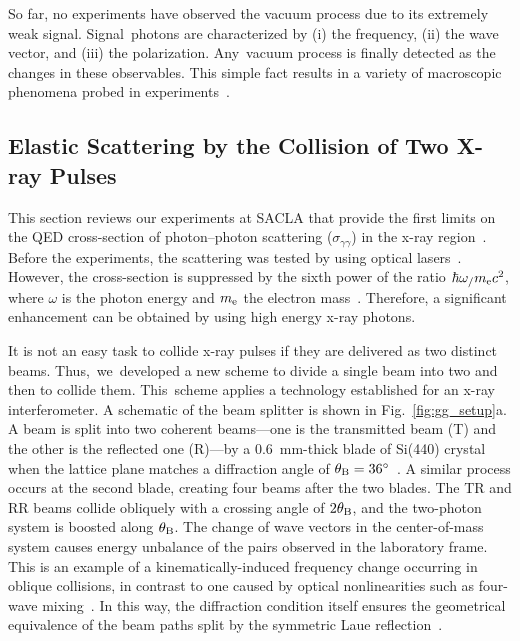\documentclass[10pt,a4paper]{article}%
\begin{document}
So far, no experiments have observed the vacuum process due to its extremely weak signal.
Signal~photons are characterized by (i) the frequency, (ii) the wave vector, and (iii) the polarization.
Any~vacuum process is finally detected as the changes in these observables.
This simple fact results in a variety of macroscopic phenomena probed in experiments~\cite{review1, review2}.

\subsection{Elastic Scattering by the Collision of Two X-ray Pulses}\label{subsec:gg}

This section reviews our experiments at SACLA that provide the first limits on the QED cross-section of photon--photon scattering ($\sigma_{\gamma\gamma}$) in the x-ray region~\cite{gg1,gg2}.
Before the experiments, the scattering was tested by using optical lasers~\cite{moulin}.
However, the cross-section is suppressed by the sixth power of the ratio $\hbar \omega_/m_{{\rm e}}c^{2}$,
where $\omega$ is the photon energy and $m_{{\rm e}}$ the electron mass~\cite{gg_xsec1, gg_xsec2}.
Therefore, a significant enhancement can be obtained by using high energy x-ray photons.

It is not an easy task to collide x-ray pulses if they are delivered as two distinct beams.
Thus,~we~developed a new scheme to divide a single beam into two and then to collide them.
This~scheme applies a technology established for an x-ray interferometer.
A schematic of the beam splitter is shown in Fig.~\ref{fig:gg_setup}a.
A beam is split into two coherent beams---one is the transmitted beam (T) and the other is the reflected one (R)---by a 0.6~mm-thick blade of Si(440) crystal when the lattice plane matches a diffraction angle of $\theta_{{\rm B}}=36^\circ$~\cite{bonse1}.
A similar process occurs at the second blade, creating four beams after the two blades.
The TR and RR beams collide obliquely with a crossing angle of $2 \theta_{{\rm B}}$, and the two-photon system is boosted along $\theta_{{\rm B}}$.
The change of wave vectors in the center-of-mass system causes energy unbalance of the pairs observed in the laboratory frame.
This is an example of a kinematically-induced frequency change occurring in oblique collisions, in contrast to one caused by optical nonlinearities such as four-wave mixing~\cite{bernard}.
In this way, the diffraction condition itself ensures the geometrical equivalence of the beam paths split by the symmetric Laue reflection~\cite{bonse2}.
\end{document}
